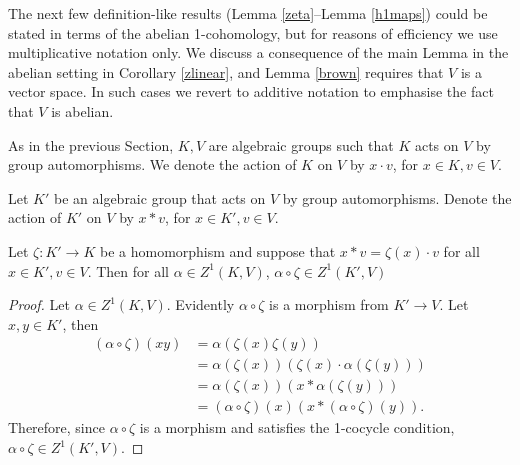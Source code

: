 The next few definition-like results (Lemma \ref{zeta}--Lemma \ref{h1maps}) could be stated in terms of the abelian 1-cohomology, but for reasons of efficiency we use multiplicative notation only. We discuss a consequence of the main Lemma in the abelian setting in Corollary \ref{zlinear}, and Lemma \ref{brown} requires that $V$ is a vector space. In such cases we revert to additive notation to emphasise the fact that $V$ is abelian.

As in the previous Section, $K, V$ are algebraic groups such that $K$ acts on $V$ by group automorphisms. We denote the action of $K$ on $V$ by $x \cdot v$, for $x \in K, v \in V$.

\begin{lemma} \label{zeta}
	Let $K'$ be an algebraic group that acts on $V$ by group automorphisms. Denote the action of $K'$ on $V$ by $x \ast v$, for $x \in K', v \in V$.

	Let $\zeta:K'\rightarrow K$ be a homomorphism and suppose that $x \ast v = \zeta(x) \cdot v$ for all $x \in K', v \in V$. Then for all $\alpha \in Z^1(K, V)$, $\alpha \circ \zeta \in Z^1(K', V)$ 
\end{lemma}
\begin{proof}
	Let $\alpha \in Z^1(K, V)$. Evidently $\alpha \circ \zeta$ is a morphism from $K' \rightarrow V$. Let $x, y \in K'$, then
	\begin{align*}
		(\alpha \circ \zeta)(xy) &= \alpha\left(\zeta(x)\zeta(y)\right) \\
			&= \alpha(\zeta(x))\left(\zeta(x) \cdot \alpha(\zeta(y))\right) \\
			&= \alpha(\zeta(x))\left(x \ast \alpha(\zeta(y))\right) \\
			&= (\alpha \circ \zeta)(x)\left(x \ast (\alpha \circ \zeta)(y)\right).
	\end{align*}
	Therefore, since $\alpha \circ \zeta$ is a morphism and satisfies the 1-cocycle condition, $\alpha \circ \zeta \in Z^1(K', V)$.
\end{proof}

